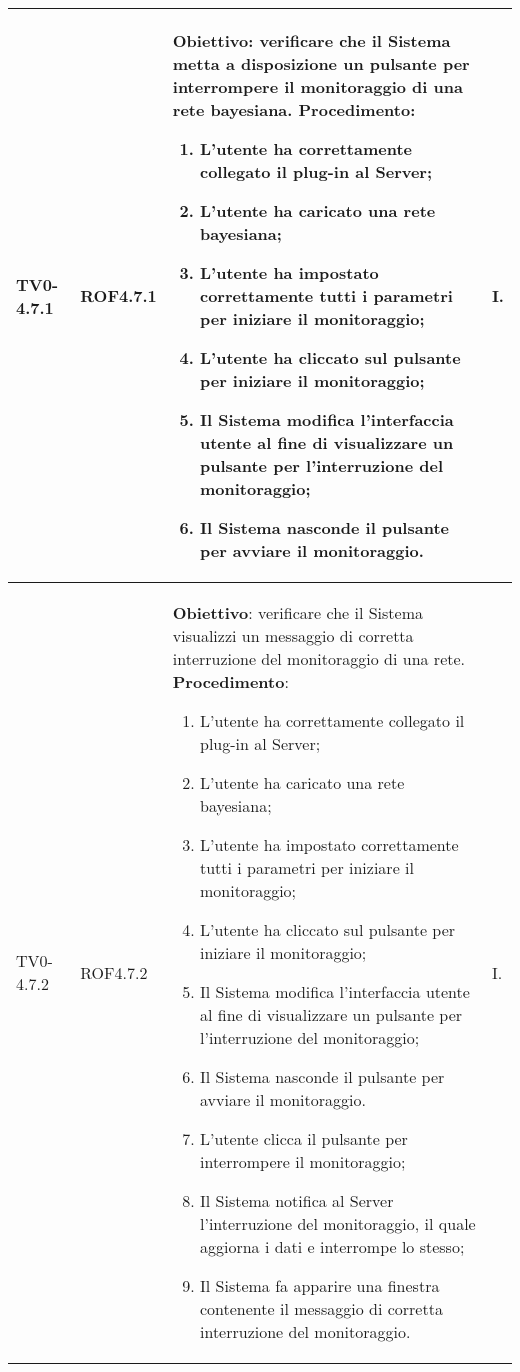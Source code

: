 \begin{longtable}{|C{.15\textwidth}|C{.13\textwidth}|m{.52\textwidth}|C{.08\textwidth}|}
TV0-4.7.1 & ROF4.7.1 &
	\textbf{Obiettivo}: verificare che il Sistema metta a disposizione un pulsante per interrompere il monitoraggio di una rete bayesiana. \newline
	\textbf{Procedimento}:
	\begin{enumerate}
		\item L'utente ha correttamente collegato il plug-in al Server;
		\item L'utente ha caricato una rete bayesiana;
		\item L'utente ha impostato correttamente tutti i parametri per iniziare il monitoraggio;
		\item L'utente ha cliccato sul pulsante per iniziare il monitoraggio;
		\item Il Sistema modifica l'interfaccia utente al fine di visualizzare un pulsante per l'interruzione del monitoraggio;
		\item Il Sistema nasconde il pulsante per avviare il monitoraggio.
	\end{enumerate}
	& I. \\
\hline

TV0-4.7.2 & ROF4.7.2 &
	\textbf{Obiettivo}: verificare che il Sistema visualizzi un messaggio di corretta interruzione del monitoraggio di una rete. \newline
	\textbf{Procedimento}:
	\begin{enumerate}
		\item L'utente ha correttamente collegato il plug-in al Server;
		\item L'utente ha caricato una rete bayesiana;
		\item L'utente ha impostato correttamente tutti i parametri per iniziare il monitoraggio;
		\item L'utente ha cliccato sul pulsante per iniziare il monitoraggio;
		\item Il Sistema modifica l'interfaccia utente al fine di visualizzare un pulsante per l'interruzione del monitoraggio;
		\item Il Sistema nasconde il pulsante per avviare il monitoraggio.
		\item L'utente clicca il pulsante per interrompere il monitoraggio;
		\item Il Sistema notifica al Server l'interruzione del monitoraggio, il quale aggiorna i dati e interrompe lo stesso;
		\item Il Sistema fa apparire una finestra contenente il messaggio di corretta interruzione del monitoraggio.
	\end{enumerate}
	& I. \\
\hline


\end{longtable}
